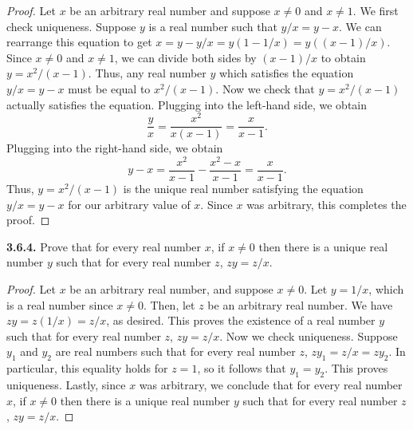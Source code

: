 \documentclass[12pt]{amsart}
\newenvironment{statement}[1]{\smallskip\noindent\color[rgb]{.6627, .3529, .6314} {\bf #1.}}{}
\theoremstyle{definition}
\theoremstyle{remark}
\begin{document}
\begin{proof}
Let $x$ be an arbitrary real number and suppose $x \neq 0$ and $x \neq 1$.
We first check uniqueness.
Suppose $y$ is a real number such that $y/x = y - x$.
We can rearrange this equation to get $x = y - y/x = y (1 - 1/x) = y((x - 1)/x)$.
Since $x  \neq 0$ and $x \neq 1$, we can divide both sides by $(x - 1)/x$ to obtain $y = x^2/(x - 1)$.
Thus, any real number $y$ which satisfies the equation $y/x = y - x$ must be equal to $x^2/(x - 1)$.
Now we check that $y = x^2/(x - 1)$ actually satisfies the equation.
Plugging into the left-hand side, we obtain
\begin{equation*}
	\frac{y}{x} = \frac{x^2}{x(x - 1)} = \frac{x}{x - 1}.
\end{equation*}
Plugging into the right-hand side, we obtain
\begin{equation*}
	y - x = \frac{x^2}{x - 1} - \frac{x^2 - x}{x - 1} = \frac{x}{x - 1}.
\end{equation*}
Thus, $y = x^2/(x - 1)$ is the unique real number satisfying the equation $y/x = y - x$ for our arbitrary value of $x$.
Since $x$ was arbitrary, this completes the proof.
\end{proof}


\begin{statement}{3.6.4}
Prove that for every real number $x$, if $x \neq 0$ then there is a unique real number $y$ such that for every real number $z$, $zy = z/x$.
\end{statement}

\begin{proof}
Let $x$ be an arbitrary real number, and suppose $x \neq 0$.
Let $y = 1/x$, which is a real number since $x \neq 0$.
Then, let $z$ be an arbitrary real number.
We have $zy = z(1/x) = z/x$, as desired.
This proves the existence of a real number $y$ such that for every real number $z$, $zy = z/x$.
Now we check uniqueness.
Suppose $y_1$ and $y_2$ are real numbers such that for every real number $z$, $zy_1 = z/x = zy_2$.
In particular, this equality holds for $z = 1$, so it follows that $y_1 = y_2$.
This proves uniqueness.
Lastly, since $x$ was arbitrary, we conclude that for every real number $x$, if $x \neq 0$ then there is a unique real number $y$ such that for every real number $z$, $zy = z/x$.
\end{proof}
\end{document}
